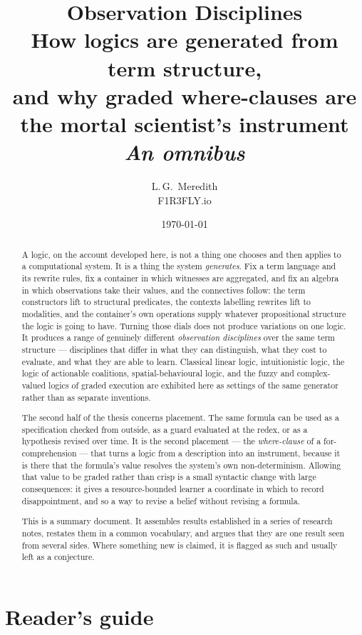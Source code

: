 \documentclass[11pt]{article}
\title{\bfseries Observation Disciplines\\[4pt]
\large How logics are generated from term structure,\\
and why graded where-clauses are the mortal scientist's instrument\\[6pt]
\normalsize\normalfont\itshape An omnibus}
\author{L.\,G.\ Meredith\\\small F1R3FLY.io}
\date{\today}
\theoremstyle{definition}
\theoremstyle{plain}
\begin{document}
\maketitle

\begin{abstract}
\noindent
A logic, on the account developed here, is not a thing one chooses and then
applies to a computational system. It is a thing the system \emph{generates}.
Fix a term language and its rewrite rules, fix a container in which witnesses
are aggregated, and fix an algebra in which observations take their values, and
the connectives follow: the term constructors lift to structural predicates, the
contexts labelling rewrites lift to modalities, and the container's own
operations supply whatever propositional structure the logic is going to have.
Turning those dials does not produce variations on one logic. It produces a
range of genuinely different \emph{observation disciplines} over the same term
structure --- disciplines that differ in what they can distinguish, what they
cost to evaluate, and what they are able to learn. Classical linear logic,
intuitionistic logic, the logic of actionable coalitions, spatial-behavioural
logic, and the fuzzy and complex-valued logics of graded execution are exhibited
here as settings of the same generator rather than as separate inventions.

The second half of the thesis concerns placement. The same formula can be used
as a specification checked from outside, as a guard evaluated at the redex, or
as a hypothesis revised over time. It is the second placement --- the
\emph{where-clause} of a for-comprehension --- that turns a logic from a
description into an instrument, because it is there that the formula's value
resolves the system's own non-determinism. Allowing that value to be graded
rather than crisp is a small syntactic change with large consequences: it gives
a resource-bounded learner a coordinate in which to record disappointment, and
so a way to revise a belief without revising a formula.

This is a summary document. It assembles results established in a series of
research notes, restates them in a common vocabulary, and argues that they are
one result seen from several sides. Where something new is claimed, it is
flagged as such and usually left as a conjecture.
\end{abstract}

\tableofcontents

\newpage

\section*{Reader's guide}
\end{document}
